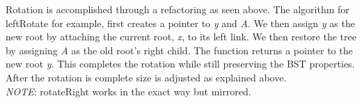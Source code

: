 \documentclass[11pt]{article}
\begin{document}
\begin{center}
\hspace{2cm}

\end{center}

    Rotation is accomplished through a refactoring as seen above. The algorithm for leftRotate for example, first creates a pointer to \textit{y} and \textit{A}. We then assign \textit{y} as the new root by attaching the current root, \textit{x}, to its left link. We then restore the tree by assigning \textit{A} as the old root's right child. The function returns a pointer to the new root \textit{y}. This completes the rotation while still preserving the BST properties. After the rotation is complete size is adjusted as explained above. \\
    \textit{NOTE}: rotateRight works in the exact way but mirrored.

\pagebreak
\end{document}
